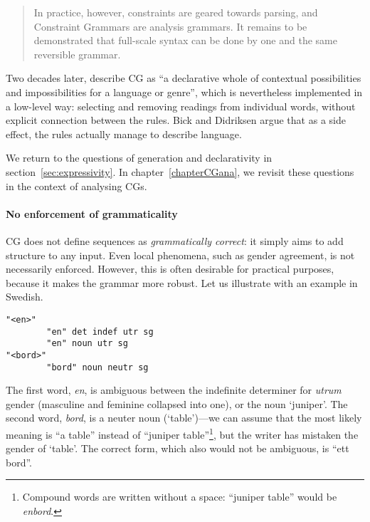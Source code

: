 \begin{quote}
In practice, however, constraints are geared towards parsing, and Constraint Grammars are analysis grammars. It remains to be demonstrated that full-scale syntax can be done by one and the same reversible grammar.
\end{quote}
\noindent Two decades later, \cite{bick2015} describe CG as ``a
declarative whole of contextual possibilities and impossibilities for
a language or genre'', which is nevertheless implemented in a
low-level way: selecting and removing readings from individual words,
without explicit connection between the rules. Bick and Didriksen
argue that as a side effect, the rules actually manage to describe language.

We return to the questions of generation and declarativity in section~\ref{sec:expressivity}. 
In chapter~\ref{chapterCGana}, we revisit these questions in the context of analysing CGs.

 
\paragraph{No enforcement of grammaticality} 




CG does not define sequences as \emph{grammatically correct}: it simply aims to add structure to any input.
Even local phenomena, such as gender agreement, is not necessarily enforced.
However, this is often desirable for practical purposes, because it makes the grammar more robust.
Let us illustrate with an example in Swedish.

\begin{verbatim}
"<en>"
        "en" det indef utr sg
        "en" noun utr sg 
"<bord>"
        "bord" noun neutr sg
\end{verbatim}

The first word, \emph{en}, is ambiguous between the indefinite determiner for
\emph{utrum} gender  (masculine and feminine collapsed into one), or the noun `juniper'.
The second word, \emph{bord}, is a neuter noun (`table')---we can assume that the
most likely meaning is ``a table'' instead of ``juniper table''\footnote{Compound words are written without a space: ``juniper table'' would be \emph{enbord}.}, but the writer has mistaken the gender of `table'. The correct form, which also would not be ambiguous, is ``ett bord''.

